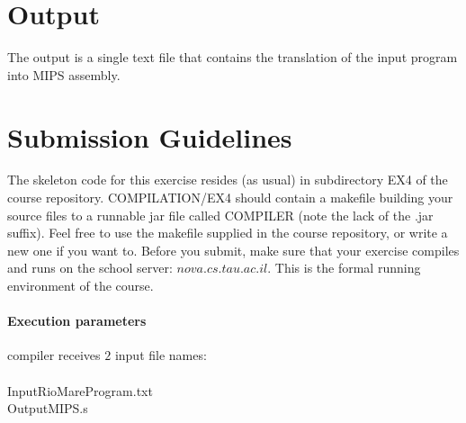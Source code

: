 \documentclass{article}
\begin{document}
\section{Output}
The output is a single text file that contains the
translation of the input program into MIPS assembly.

\section{Submission Guidelines}
The skeleton code for this exercise resides (as usual)
in subdirectory EX4 of the course repository.
COMPILATION/EX4 should contain a makefile building your source files to a
runnable jar file called COMPILER (note the lack of the .jar suffix).
Feel free to use the makefile supplied in the course repository,
or write a new one if you want to. 
Before you submit, make sure that your exercise compiles and runs
on the school server: $nova.cs.tau.ac.il$.
This is the formal running environment of the course.

\paragraph{Execution parameters}
compiler receives $2$ input file names:\\ \\
InputRioMareProgram.txt\\
OutputMIPS.s
\end{document}
